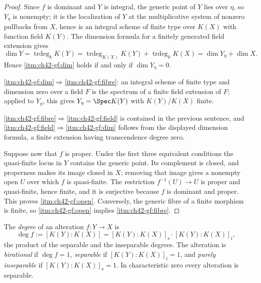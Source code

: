 \begin{proof}
Since $f$ is dominant and $Y$ is integral, the generic point of $Y$
lies over $\eta$, so $Y_\eta$ is nonempty; it is the localization of
$Y$ at the multiplicative system of nonzero pullbacks from $X$, hence is
an integral scheme of finite type over $K(X)$ with function field
$K(Y)$.  The dimension formula for a finitely generated field extension
gives
\[
 \dim Y=\operatorname{trdeg}_kK(Y)
       =\operatorname{trdeg}_{K(X)}K(Y)+\operatorname{trdeg}_kK(X)
       =\dim Y_\eta+\dim X .
\]
Hence \cref{itm:ch42-gf:dim} holds if and only if $\dim Y_\eta=0$.

\cref{itm:ch42-gf:dim}$\Rightarrow$\cref{itm:ch42-gf:fibre}: an integral
scheme of finite type and dimension zero over a field $F$ is the spectrum
of a finite field extension of $F$; applied to $Y_\eta$, this gives
$Y_\eta=\Spec K(Y)$ with $K(Y)/K(X)$ finite.

\cref{itm:ch42-gf:fibre}$\Rightarrow$\cref{itm:ch42-gf:field} is contained in
the previous sentence, and
\cref{itm:ch42-gf:field}$\Rightarrow$\cref{itm:ch42-gf:dim} follows from the
displayed dimension formula, a finite extension having transcendence degree
zero.

Suppose now that $f$ is proper.  Under the first three equivalent
conditions the quasi-finite locus in $Y$ contains the generic point.  Its
complement is closed, and properness makes its image closed in $X$; removing
that image gives a nonempty open $U$ over which $f$ is quasi-finite.
The restriction $f^{-1}(U)\to U$ is proper and quasi-finite, hence finite,
and it is surjective because $f$ is dominant and proper.  This proves
\cref{itm:ch42-gf:open}.  Conversely, the generic fibre of a finite
morphism is finite, so \cref{itm:ch42-gf:open} implies
\cref{itm:ch42-gf:fibre}.
\end{proof}

\begin{definition}
\label{def:ch42-alteration-degree}
The \emph{degree} of an alteration $f:Y\to X$ is
\[
 \deg f:=[K(Y):K(X)]
       =[K(Y):K(X)]_{\mathrm s}\cdot[K(Y):K(X)]_{\mathrm i},
\]
the product of the separable and the inseparable degrees.  The alteration is
\emph{birational} if $\deg f=1$, \emph{separable} if
$[K(Y):K(X)]_{\mathrm i}=1$, and \emph{purely inseparable} if
$[K(Y):K(X)]_{\mathrm s}=1$.  In characteristic zero every alteration is
separable.
\end{definition}

